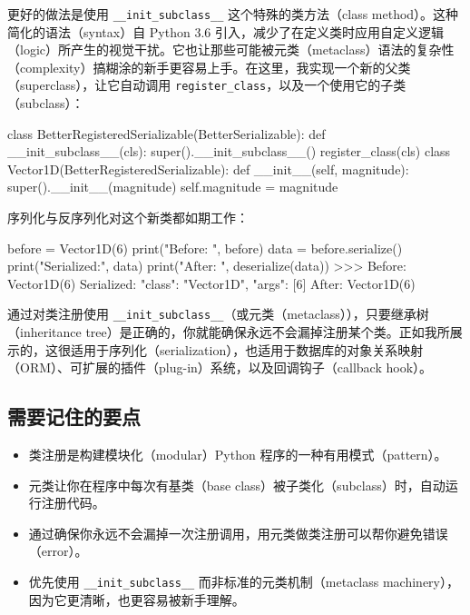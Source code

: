更好的做法是使用 \texttt{\_\_init\_subclass\_\_} 这个特殊的类方法（class method）。这种简化的语法（syntax）自 Python 3.6 引入，减少了在定义类时应用自定义逻辑（logic）所产生的视觉干扰。它也让那些可能被元类（metaclass）语法的复杂性（complexity）搞糊涂的新手更容易上手。在这里，我实现一个新的父类（superclass），让它自动调用 \texttt{register\_class}，以及一个使用它的子类（subclass）：

\begin{codebox}[python]
class BetterRegisteredSerializable(BetterSerializable):
    def __init_subclass__(cls):
        super().__init_subclass__()
        register_class(cls)
class Vector1D(BetterRegisteredSerializable):
    def __init__(self, magnitude):
        super().__init__(magnitude)
        self.magnitude = magnitude
\end{codebox}

序列化与反序列化对这个新类都如期工作：

\begin{codebox}[python]
before = Vector1D(6)
print("Before:    ", before)
data = before.serialize()
print("Serialized:", data)
print("After:     ", deserialize(data))
>>>
Before:     Vector1D(6)
Serialized: {"class": "Vector1D", "args": [6]}
After:      Vector1D(6)
\end{codebox}

通过对类注册使用 \texttt{\_\_init\_subclass\_\_}（或元类（metaclass）），只要继承树（inheritance tree）是正确的，你就能确保永远不会漏掉注册某个类。正如我所展示的，这很适用于序列化（serialization），也适用于数据库的对象关系映射（ORM）、可扩展的插件（plug-in）系统，以及回调钩子（callback hook）。

\subsection{需要记住的要点}

\begin{itemize}
\item 类注册是构建模块化（modular）Python 程序的一种有用模式（pattern）。
\item 元类让你在程序中每次有基类（base class）被子类化（subclass）时，自动运行注册代码。
\item 通过确保你永远不会漏掉一次注册调用，用元类做类注册可以帮你避免错误（error）。
\item 优先使用 \texttt{\_\_init\_subclass\_\_} 而非标准的元类机制（metaclass machinery），因为它更清晰，也更容易被新手理解。
\end{itemize}

